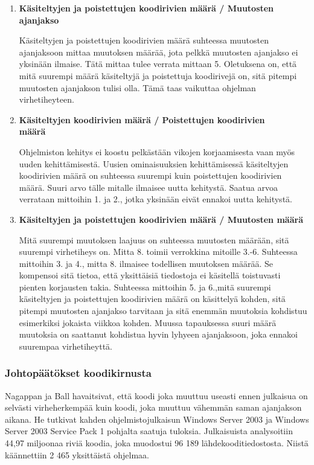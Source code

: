 \documentclass[finnish]{../tktltiki2}
\theoremstyle{definition}
\theoremstyle{remark}
\begin{document}
\begin{enumerate}
    \item {\bf Käsiteltyjen ja poistettujen koodirivien määrä / Muutosten ajanjakso}
    
    Käsiteltyjen ja poistettujen koodirivien määrä suhteessa muutosten ajanjaksoon mittaa muutoksen määrää, jota pelkkä 
    muutosten ajanjakso ei yksinään ilmaise. Tätä mittaa tulee verrata mittaan 5. Oletuksena on, että mitä suurempi 
    määrä käsiteltyjä ja poistettuja koodirivejä on, sitä pitempi muutosten ajanjakson tulisi olla. Tämä taas vaikuttaa 
    ohjelman virhetiheyteen.

    \item {\bf Käsiteltyjen koodirivien määrä / Poistettujen koodirivien\\määrä}
    
    Ohjelmiston kehitys ei koostu pelkästään vikojen korjaamisesta vaan myös uuden kehittämisestä. Uusien ominaisuuksien 
    kehittämisessä käsiteltyjen koodirivien määrä on suhteessa suurempi kuin poistettujen koodirivien määrä. Suuri arvo 
    tälle mitalle ilmaisee uutta kehitystä. Saatua arvoa verrataan mittoihin 1. ja 2., jotka yksinään eivät ennakoi 
    uutta kehitystä.

    \item {\bf Käsiteltyjen ja poistettujen koodirivien määrä / Muutosten määrä}
    
    Mitä suurempi muutoksen laajuus on suhteessa muutosten määrään, sitä suurempi virhetiheys on. Mitta 8. toimii
    verrokkina mitoille 3.-6. Suhteessa mittoihin 3. ja 4., mitta 8. ilmaisee todellisen muutoksen määrää. Se kompensoi
    sitä tietoa, että yksittäisiä tiedostoja ei käsitellä toistuvasti pienten korjausten takia. Suhteessa mittoihin 5. 
    ja 6.,mitä suurempi käsiteltyjen ja poistettujen koodirivien määrä on käsittelyä kohden, sitä pitempi muutosten 
    ajanjakso tarvitaan ja sitä enemmän muutoksia kohdistuu esimerkiksi jokaista viikkoa kohden. Muussa tapauksessa 
    suuri määrä muutoksia on saattanut kohdistua hyvin lyhyeen ajanjaksoon, joka ennakoi suurempaa virhetiheyttä.

\end{enumerate}

\subsubsection{Johtopäätökset koodikirnusta}

Nagappan ja Ball havaitsivat, että koodi joka muuttuu useasti ennen julkaisua on selvästi virheherkempää kuin koodi, 
joka muuttuu vähemmän saman ajanjakson aikana. He tutkivat kahden ohjelmistojulkaisun Windows Server 2003 ja Windows 
Server 2003 Service Pack 1 pohjalta saatuja tuloksia. Julkaisuista analysoitiin 44,97 miljoonaa riviä koodia, joka 
muodostui 96 189 lähdekooditiedostosta. Niistä käännettiin 2 465 yksittäistä ohjelmaa.\newline
\end{document}
